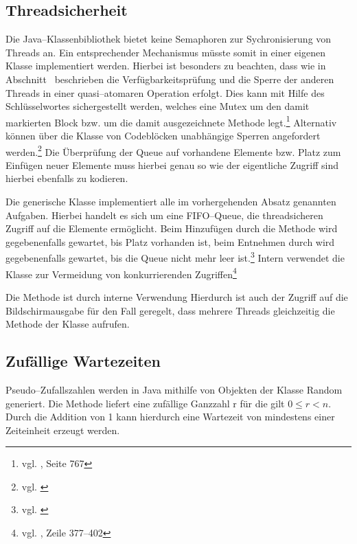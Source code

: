 
\subsection{Threadsicherheit} %
\label{sub:realisierung_mit_linkedblockingqueue}
Die Java–Klassenbibliothek bietet keine Semaphoren zur Sychronisierung von Threads an. Ein entsprechender Mechanismus müsste somit in einer eigenen Klasse implementiert werden. Hierbei ist besonders zu beachten, dass wie in Abschnitt~ beschrieben die Verfügbarkeitsprüfung und die Sperre der anderen Threads in einer quasi–atomaren Operation erfolgt. Dies kann mit Hilfe des Schlüsselwortes  sichergestellt werden, welches eine \ac{Mutex} um den damit markierten Block bzw. um die damit ausgezeichnete Methode legt.\footnote{vgl. \cite{javaorange}, Seite 767} Alternativ können über die Klasse  von Codeblöcken unabhängige Sperren angefordert werden.\footnote{vgl. \cite{javadoc:rl}} Die Überprüfung der Queue auf vorhandene Elemente bzw. Platz zum Einfügen neuer Elemente muss hierbei genau so wie der eigentliche Zugriff sind hierbei ebenfalls zu kodieren.

Die generische Klasse  implementiert alle im vorhergehenden Absatz genannten Aufgaben. Hierbei handelt es sich um eine FIFO–Queue, die threadsicheren Zugriff auf die Elemente ermöglicht. Beim Hinzufügen durch die Methode  wird gegebenenfalls gewartet, bis Platz vorhanden ist, beim Entnehmen durch  wird gegebenenfalls gewartet, bis die Queue nicht mehr leer ist.\footnote{vgl. \cite{javadoc:lbq}} Intern verwendet die Klasse  zur Vermeidung von konkurrierenden Zugriffen\footnote{vgl. \cite{javadoc:lbqsource}, Zeile 377–402}

Die Methode  ist durch interne Verwendung  Hierdurch ist auch der Zugriff auf die Bildschirmausgabe für den Fall geregelt, dass mehrere Threads gleichzeitig die Methode  der Klasse  aufrufen.

\subsection{Zufällige Wartezeiten} %
\label{sub:zufall}
Pseudo–Zufallszahlen werden in Java mithilfe von Objekten der Klasse Random generiert. Die Methode  liefert eine zufällige Ganzzahl r für die gilt $0 \leq r < n$. Durch die Addition von 1 kann hierdurch eine Wartezeit von mindestens einer Zeiteinheit erzeugt werden.

